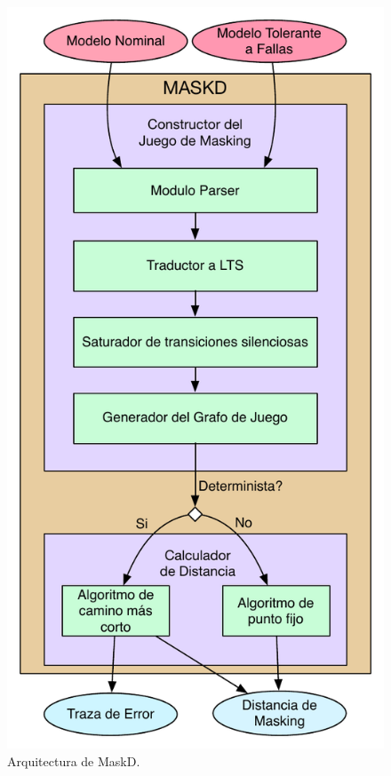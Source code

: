 \begin{figure}[ht]
    \centering
    \includegraphics[scale=0.5]{Figs/MASKD_ARCH.pdf}
    \caption{Arquitectura de \textsf{MaskD}.}\label{fig:arch}
\end{figure}

